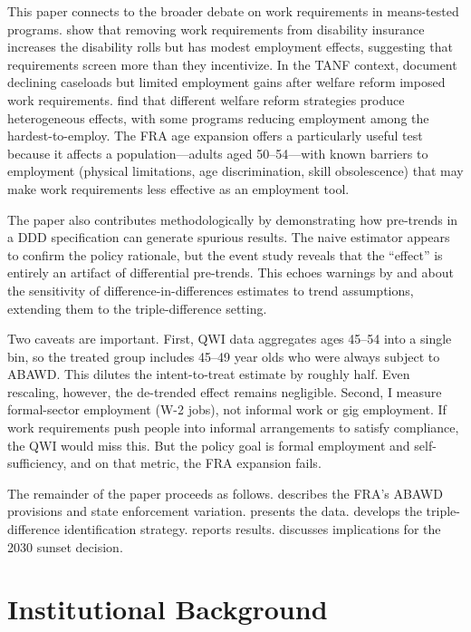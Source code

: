 \documentclass[12pt]{article}
\begin{document}
This paper connects to the broader debate on work requirements in means-tested programs. \citet{deshpande2019drives} show that removing work requirements from disability insurance increases the disability rolls but has modest employment effects, suggesting that requirements screen more than they incentivize. In the TANF context, \citet{ziliak2016tanf} document declining caseloads but limited employment gains after welfare reform imposed work requirements. \citet{bitler2006welfare} find that different welfare reform strategies produce heterogeneous effects, with some programs reducing employment among the hardest-to-employ. The FRA age expansion offers a particularly useful test because it affects a population---adults aged 50--54---with known barriers to employment (physical limitations, age discrimination, skill obsolescence) that may make work requirements less effective as an employment tool.

The paper also contributes methodologically by demonstrating how pre-trends in a DDD specification can generate spurious results. The naive estimator appears to confirm the policy rationale, but the event study reveals that the ``effect'' is entirely an artifact of differential pre-trends. This echoes warnings by \citet{rambachan2023more} and \citet{roth2023pretest} about the sensitivity of difference-in-differences estimates to trend assumptions, extending them to the triple-difference setting.

Two caveats are important. First, QWI data aggregates ages 45--54 into a single bin, so the treated group includes 45--49 year olds who were always subject to ABAWD. This dilutes the intent-to-treat estimate by roughly half. Even rescaling, however, the de-trended effect remains negligible. Second, I measure formal-sector employment (W-2 jobs), not informal work or gig employment. If work requirements push people into informal arrangements to satisfy compliance, the QWI would miss this. But the policy goal is formal employment and self-sufficiency, and on that metric, the FRA expansion fails.

The remainder of the paper proceeds as follows.  describes the FRA's ABAWD provisions and state enforcement variation.  presents the data.  develops the triple-difference identification strategy.  reports results.  discusses implications for the 2030 sunset decision.


\section{Institutional Background}
\label{sec:background}
\end{document}
